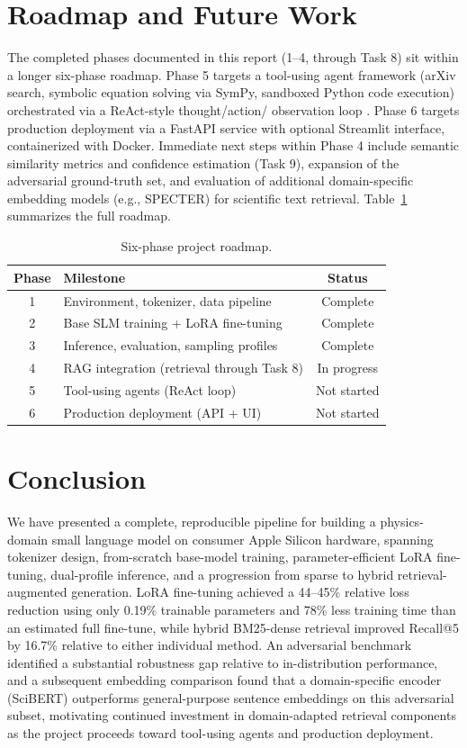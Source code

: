 \documentclass[11pt]{article}
\begin{document}
\section{Roadmap and Future Work}
\label{sec:roadmap}
The completed phases documented in this report (1--4, through Task 8) sit
within a longer six-phase roadmap. Phase 5 targets a tool-using agent
framework (arXiv search, symbolic equation solving via SymPy, sandboxed
Python code execution) orchestrated via a ReAct-style thought/action/
observation loop \cite{lewis2020rag}. Phase 6 targets production deployment
via a FastAPI service with optional Streamlit interface, containerized with
Docker. Immediate next steps within Phase 4 include semantic similarity
metrics and confidence estimation (Task 9), expansion of the adversarial
ground-truth set, and evaluation of additional domain-specific embedding
models (e.g., SPECTER) for scientific text retrieval. Table~\ref{tab:roadmap}
summarizes the full roadmap.

\begin{table}[h]
\centering
\caption{Six-phase project roadmap.}
\label{tab:roadmap}
\begin{tabular}{@{}clc@{}}
\toprule
Phase & Milestone & Status \\
\midrule
1 & Environment, tokenizer, data pipeline & Complete \\
2 & Base SLM training + LoRA fine-tuning & Complete \\
3 & Inference, evaluation, sampling profiles & Complete \\
4 & RAG integration (retrieval through Task 8) & In progress \\
5 & Tool-using agents (ReAct loop) & Not started \\
6 & Production deployment (API + UI) & Not started \\
\bottomrule
\end{tabular}
\end{table}

\section{Conclusion}
We have presented a complete, reproducible pipeline for building a
physics-domain small language model on consumer Apple Silicon hardware,
spanning tokenizer design, from-scratch base-model training, parameter-efficient
LoRA fine-tuning, dual-profile inference, and a progression from sparse to
hybrid retrieval-augmented generation. LoRA fine-tuning achieved a 44--45\%
relative loss reduction using only 0.19\% trainable parameters and 78\%
less training time than an estimated full fine-tune, while hybrid
BM25-dense retrieval improved Recall@5 by 16.7\% relative to either
individual method. An adversarial benchmark identified a substantial
robustness gap relative to in-distribution performance, and a subsequent
embedding comparison found that a domain-specific encoder (SciBERT)
outperforms general-purpose sentence embeddings on this adversarial subset,
motivating continued investment in domain-adapted retrieval components as
the project proceeds toward tool-using agents and production deployment.
\end{document}

